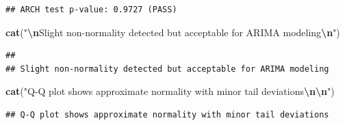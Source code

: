 \documentclass[
]{article}
\newenvironment{Shaded}{\begin{snugshade}}{\end{snugshade}}
\newcommand{\AttributeTok}[1]{\textcolor[rgb]{0.13,0.29,0.53}{#1}}
\newcommand{\CommentTok}[1]{\textcolor[rgb]{0.56,0.35,0.01}{\textit{#1}}}
\newcommand{\DecValTok}[1]{\textcolor[rgb]{0.00,0.00,0.81}{#1}}
\newcommand{\FloatTok}[1]{\textcolor[rgb]{0.00,0.00,0.81}{#1}}
\newcommand{\FunctionTok}[1]{\textcolor[rgb]{0.13,0.29,0.53}{\textbf{#1}}}
\newcommand{\NormalTok}[1]{#1}
\newcommand{\OtherTok}[1]{\textcolor[rgb]{0.56,0.35,0.01}{#1}}
\newcommand{\SpecialCharTok}[1]{\textcolor[rgb]{0.81,0.36,0.00}{\textbf{#1}}}
\newcommand{\StringTok}[1]{\textcolor[rgb]{0.31,0.60,0.02}{#1}}
\begin{document}
\begin{Shaded}
\end{Shaded}

\begin{verbatim}
## ARCH test p-value: 0.9727 (PASS)
\end{verbatim}

\begin{Shaded}
\begin{Highlighting}[]
\FunctionTok{cat}\NormalTok{(}\StringTok{"}\SpecialCharTok{\textbackslash{}n}\StringTok{Slight non{-}normality detected but acceptable for ARIMA modeling}\SpecialCharTok{\textbackslash{}n}\StringTok{"}\NormalTok{)}
\end{Highlighting}
\end{Shaded}

\begin{verbatim}
## 
## Slight non-normality detected but acceptable for ARIMA modeling
\end{verbatim}

\begin{Shaded}
\begin{Highlighting}[]
\FunctionTok{cat}\NormalTok{(}\StringTok{"Q{-}Q plot shows approximate normality with minor tail deviations}\SpecialCharTok{\textbackslash{}n\textbackslash{}n}\StringTok{"}\NormalTok{)}
\end{Highlighting}
\end{Shaded}

\begin{verbatim}
## Q-Q plot shows approximate normality with minor tail deviations
\end{verbatim}
\end{document}
